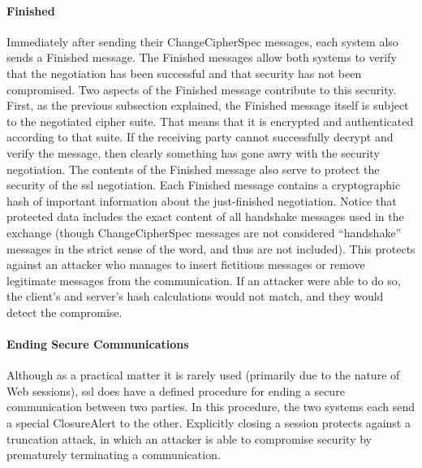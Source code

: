 \paragraph*{Finished}
Immediately after sending their ChangeCipherSpec messages, each
system also sends a Finished message. The Finished messages allow
both systems to verify that the negotiation has been successful and
that security has not been compromised. Two aspects of the Finished
message contribute to this security. First, as the previous subsection
explained, the Finished message itself is subject to the negotiated cipher suite. 
That means that it is encrypted and authenticated according to that suite.
 If the receiving party cannot successfully decrypt
and verify the message, then clearly something has gone awry with
the security negotiation.
The contents of the Finished message also serve to protect the security of the
 ssl negotiation. Each Finished message contains a cryptographic hash of 
 important information about the just-finished
negotiation.  Notice that protected data includes the exact content of all
handshake messages used in the exchange (though ChangeCipherSpec messages 
are not considered “handshake” messages in the strict
sense of the word, and thus are not included). This protects against
an attacker who manages to insert fictitious messages or remove 
legitimate messages from the communication. If an attacker were able
to do so, the client’s and server’s hash calculations would not match,
and they would detect the compromise.

\paragraph*{Ending Secure Communications}

Although as a practical matter it is rarely used (primarily due to the
nature of Web sessions), ssl does have a defined procedure for ending a
 secure communication between two parties. In this procedure,
 the two systems each send a special ClosureAlert to the other.
Explicitly closing a session protects against a truncation attack, in
which an attacker is able to compromise security by prematurely terminating
 a communication. 

